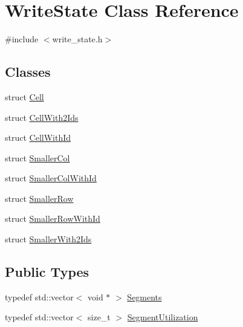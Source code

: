\hypertarget{classWriteState}{}\section{Write\+State Class Reference}
\label{classWriteState}


{\ttfamily \#include $<$write\+\_\+state.\+h$>$}

\subsection*{Classes}
\begin{DoxyCompactItemize}
\item 
struct \hyperlink{structWriteState_1_1Cell}{Cell}
\item 
struct \hyperlink{structWriteState_1_1CellWith2Ids}{Cell\+With2\+Ids}
\item 
struct \hyperlink{structWriteState_1_1CellWithId}{Cell\+With\+Id}
\item 
struct \hyperlink{structWriteState_1_1SmallerCol}{Smaller\+Col}
\item 
struct \hyperlink{structWriteState_1_1SmallerColWithId}{Smaller\+Col\+With\+Id}
\item 
struct \hyperlink{structWriteState_1_1SmallerRow}{Smaller\+Row}
\item 
struct \hyperlink{structWriteState_1_1SmallerRowWithId}{Smaller\+Row\+With\+Id}
\item 
struct \hyperlink{structWriteState_1_1SmallerWith2Ids}{Smaller\+With2\+Ids}
\end{DoxyCompactItemize}
\subsection*{Public Types}
\begin{DoxyCompactItemize}
\item 
typedef std\+::vector$<$ void $\ast$ $>$ \hyperlink{classWriteState_aad30b2ca76d7c514032911e74076cfc5}{Segments}
\item 
typedef std\+::vector$<$ size\+\_\+t $>$ \hyperlink{classWriteState_ae2a9d7195188e68b68d0c33725cbf460}{Segment\+Utilization}
\end{DoxyCompactItemize}
